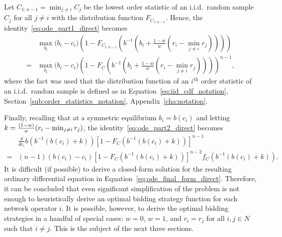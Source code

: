 Let $C_{1:n-1} = \min_{j\neq i}C_j$ be the lowest order statistic of an i.i.d.~random sample $C_j$ for all $j\neq i$ with the distribution function $F_{C_{1:n-1}}$. Hence, the identity~\eqref{eq:ode_part1_direct} becomes
\begin{align}
	&\max_{b_i}\bigg(b_i-c_i\bigg)\left(1 - F_{C_{1:n-1}}\left(b^{-1}\left(b_i + \frac{1-w}{w}(r_i-\min_{j\neq i}r_j)\right)\right)\right) \nonumber\\
	= &\max_{b_i}\bigg(b_i-c_i\bigg)\left(1 - F_{C}\left(b^{-1}\left(b_i + \frac{1-w}{w}(r_i-\min_{j\neq i}r_j)\right)\right)\right)^{n-1},
	\label{eq:ode_part2_direct}
\end{align}
where the fact was used that the distribution function of an $i^\textrm{th}$ order statistic of an i.i.d.~random sample is defined as in Equation~\eqref{eq:iid_cdf_notation}, Section~\ref{sub:order_statistics_notation}, Appendix~\ref{cha:notation}.

Finally, recalling that at a symmetric equilibrium $b_i=b(c_i)$ and letting $k=\nobreak\frac{(1-w)}{w}(r_i-\min_{j\neq i}r_j)$, the identity~\eqref{eq:ode_part2_direct} becomes
\begin{align}
	\label{eq:ode_final_form_direct}
	&\frac{d}{dc_i}b\left( b^{-1}(b(c_i) + k) \right) \left[ 1 - F_C(b^{-1}(b(c_i)+k)) \right]^{n-1} \nonumber\\
	= &(n-1)(b(c_i)-c_i)\left[ 1 - F_C(b^{-1}(b(c_i)+k)) \right]^{n-2} f_C(b^{-1}(b(c_i)+k)).
\end{align}
It is difficult (if possible) to derive a closed-form solution for the resulting ordinary differential equation in Equation~\eqref{eq:ode_final_form_direct}. Therefore, it can be concluded that even significant simplification of the problem is not enough to heuristically derive an optimal bidding strategy function for each network operator $i$. It is possible, however, to derive the optimal bidding strategies in a handful of special cases: $w=0$, $w=1$, and $r_i=r_j$ for all $i,j\in N$ such that $i\neq j$. This is the subject of the next three sections.

